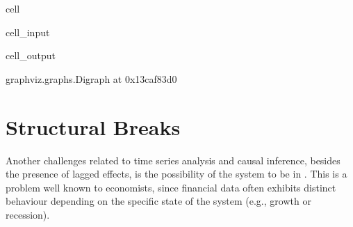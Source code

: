 \documentclass[letterpaper,10pt,english]{jupyterBook}
\begin{document}
\begin{sphinxuseclass}{cell}\begin{sphinxVerbatimInput}

\begin{sphinxuseclass}{cell_input}
\begin{sphinxVerbatim}[commandchars=\\\{\}]
\PYG{p}{[} \PYG{p}{[}\PYG{p}{]}\PYG{p}{]}   
\end{sphinxVerbatim}

\end{sphinxuseclass}\end{sphinxVerbatimInput}
\begin{sphinxVerbatimOutput}

\begin{sphinxuseclass}{cell_output}
\begin{sphinxVerbatim}[commandchars=\\\{\}]
\PYGZlt{}graphviz.graphs.Digraph at 0x13caf83d0\PYGZgt{}
\end{sphinxVerbatim}

\end{sphinxuseclass}\end{sphinxVerbatimOutput}

\end{sphinxuseclass}
\sphinxstepscope


\chapter{Structural Breaks}
\label{\detokenize{notebooks/structural_breaks_example:structural-breaks}}\label{\detokenize{notebooks/structural_breaks_example::doc}}
\sphinxAtStartPar
Another challenges related to time series analysis and causal inference, besides the presence of lagged effects, is the possibility of the system to be in . This is a problem well known to economists, since financial data often exhibits distinct behaviour depending on the specific state of the system (e.g., growth or recession).
\end{document}
